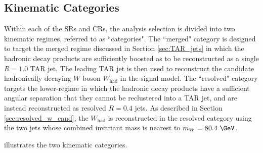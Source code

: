 \subsection{Kinematic Categories}
\label{sec:kin_categories}

Within each of the SRs and CRs, the analysis selection is divided into two kinematic regimes, referred to as ``categories". The ``merged" category is designed to target the merged regime discussed in Section \ref{sec:TAR_jets} in which the hadronic decay products are sufficiently boosted as to be reconstructed as a single \(R=1.0\) TAR jet. The leading \pt TAR jet is then used to reconstruct the candidate hadronically decaying \(W\) boson \(W_\text{had}\) in the signal model. The ``resolved" category targets the lower-\pt regime in which the hadronic decay products have a sufficient angular separation that they cannot be reclustered into a TAR jet, and are instead reconstructed as resolved \smallR \akt \(R=0.4\) jets. As described in Section \ref{sec:resolved_w_cand}, the \(W_\text{had}\) is reconstructed in the resolved category using the two \smallR jets whose combined invariant mass is nearest to \(m_W=80.4~\GeV\).

\Fig{\ref{fig:categories}} illustrates the two kinematic categories.

